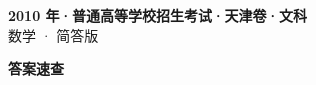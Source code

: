 \documentclass[zihao=-4, a4paper]{ctexart}
\begin{document}
\begin{center}
  {\Large\bfseries 2010 年·普通高等学校招生考试·天津卷·文科}\\[4pt]
  {\large 数学 · 简答版}
\end{center}
\medskip
{}

\clearpage
{}
\begin{center}{\Large\bfseries 答案速查}\end{center}
\medskip

\end{document}
